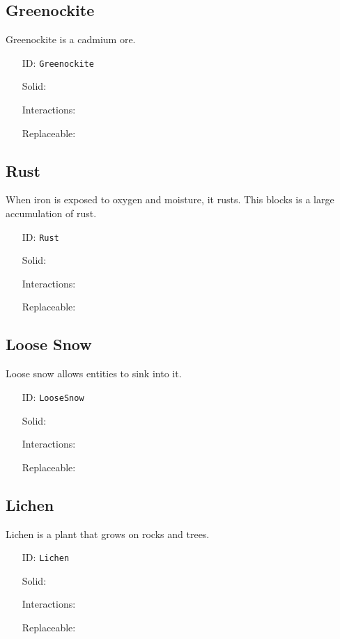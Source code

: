 \subsection{Greenockite}\label{subsec:blocks_greenockite}
Greenockite is a cadmium ore.
\newline
\begin{itemize}[nosep]
\item[ID:] \texttt{Greenockite}
\item[Solid:]  \Checkmark \item[Interactions:]  \XSolidBrush \item[Replaceable:]  \XSolidBrush \end{itemize}

\subsection{Rust}\label{subsec:blocks_rust}
When iron is exposed to oxygen and moisture, it rusts.
                This blocks is a large accumulation of rust.
\newline
\begin{itemize}[nosep]
\item[ID:] \texttt{Rust}
\item[Solid:]  \Checkmark \item[Interactions:]  \XSolidBrush \item[Replaceable:]  \XSolidBrush \end{itemize}

\subsection{Loose Snow}\label{subsec:blocks_loose snow}
Loose snow allows entities to sink into it.
\newline
\begin{itemize}[nosep]
\item[ID:] \texttt{LooseSnow}
\item[Solid:]  \XSolidBrush \item[Interactions:]  \Checkmark \item[Replaceable:]  \XSolidBrush \end{itemize}

\subsection{Lichen}\label{subsec:blocks_lichen}
Lichen is a plant that grows on rocks and trees.
\newline
\begin{itemize}[nosep]
\item[ID:] \texttt{Lichen}
\item[Solid:]  \XSolidBrush \item[Interactions:]  \XSolidBrush \item[Replaceable:]  \Checkmark \end{itemize}


